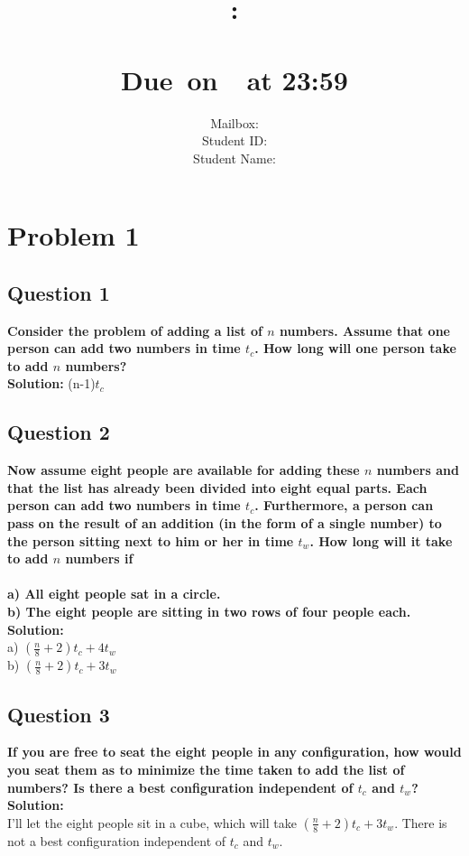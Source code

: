 \documentclass{article}
\title{
    \vspace{2in}
    \textmd{\textbf{\hmwkClass:\\  \hmwkTitle}}\\
    \normalsize\vspace{0.1in}\small{Due\ on\ \hmwkDueDate\ at 23:59 }\\
   \vspace{2in}
}
\author{
    Mailbox: \hmwkAuthorMail\\
	Student ID: \hmwkAuthorID\\
    Student Name: \hmwkAuthorName}
\date{}
\begin{document}
\maketitle
\pagebreak
\tableofcontents

\pagebreak





\section{Problem 1}
\subsection{Question 1}
\textcolor[rgb]{0,0,1}{\textbf{Consider the problem of adding a list of $n$ numbers. Assume that one person can add two numbers in time $t_{c}$. How long will one person take to add $n$ numbers?}}\\
\textbf{Solution: } (n-1)$t_{c}$
\subsection{Question 2}
\textcolor[rgb]{0,0,1}{\textbf{Now assume eight people are available for adding these $n$ numbers and that the list has already been divided into eight equal parts. Each person can add two numbers in time $t_{c}$. Furthermore, a person can pass on the result of an addition (in the form of a single number) to the person sitting next to him or her in time $t_{w}$. How long will it take to add $n$ numbers if\\\\
a) All eight people sat in a circle.\\ 
b) The eight people are sitting in two rows of four people each.\\}}
\textbf{Solution: }\\
a) $(\frac{n}{8}+2)t_{c}+4t_{w}$ \\
b) $(\frac{n}{8}+2)t_{c}+3t_{w}$ 
\subsection{Question 3}
\textcolor[rgb]{0,0,1}{\textbf{If you are free to seat the eight people in any configuration, how would you seat them as to minimize the time taken to add the list of numbers? Is there a best configuration independent of $t_{c}$ and $t_{w}$?}}\\
\textbf{Solution: }\\
I'll let the eight people sit in a cube, which will take $(\frac{n}{8}+2)t_{c}+3t_{w}$. There is not a best configuration independent of $t_{c}$ and $t_{w}$.
\end{document}
